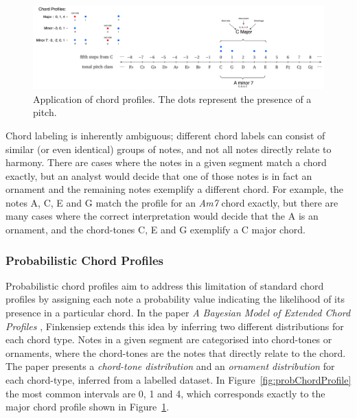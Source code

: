\documentclass[12pt,a4paper,twoside,openany]{report} \usepackage[pdfborder={0 0 0}]{hyperref}    %
\theoremstyle{definition} \newtheorem{definition}{Definition}[section]
\begin{document}
\begin{figure}[ht]
  \begin{center}
    \includegraphics[width=\textwidth]{figs/prep/inferringHarmony/chordProfiles.png}
  \end{center}
  \caption{Application of chord profiles. The dots represent the presence of a pitch.}
  \label{fig:chordProfiles}
\end{figure}

Chord labeling is inherently ambiguous; different chord labels can consist of similar (or even identical)
groups of notes, and not all notes directly relate to harmony. There are cases where the notes in a given segment
match a chord exactly, but an analyst would decide that one of those notes is in fact an ornament and the remaining
notes exemplify a different chord. For example, the notes A, C, E and G match the profile for an \textit{Am7} chord exactly, but there
are many cases where the correct interpretation would decide that the A is an ornament, and the chord-tones C, E and
G exemplify a C major chord. 

\subsubsection{Probabilistic Chord Profiles}
\label{sub:probChordProfiles}

Probabilistic chord profiles aim to address this limitation of standard chord profiles by assigning each note
a probability value indicating the likelihood of its presence in a particular chord. In the paper \textit{A Bayesian Model
of Extended Chord Profiles} \cite{finkensiepChordTypesOrnamentation2023}, Finkensiep extends this idea by inferring two different distributions for each chord type. Notes in a given segment are categorised into chord-tones or ornaments, where the
chord-tones are the notes that directly relate to the chord. The paper presents a \textit{chord-tone distribution} and an
\textit{ornament distribution} for each chord-type, inferred from a labelled dataset. In Figure~\ref{fig:probChordProfile} the most common intervals are 0,
1 and 4, which corresponds exactly to the major chord profile shown in Figure~\ref{fig:chordProfiles}.
\end{document}
